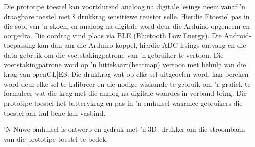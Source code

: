 Die prototipe toestel kan voortdurend analoog na digitale lesings neem vanaf 'n draagbare toestel met 8 drukkrag sensitiewe resistor selle. Hierdie Ftoestel pas in die sool van 'n skoen, en analoog na digitale word deur die Arduino opgeneem en oorgedra. Die oordrag vind plaas via BLE (Bluetooth Low Energy). Die Android-toepassing kan dan aan die Arduino koppel, hierdie ADC-lesings ontvang en die data gebruik om die voetstakingpatrone van 'n gebruiker te vertoon. Die voetstakingpatrone word op 'n hittekaart(heatmap) vertoon met behulp van die krag van openGL|ES. Die drukkrag wat op elke sel uitgeoefen word, kan bereken word deur elke sel te kalibreer en die nodige wiskunde te gebruik om 'n grafiek te formuleer wat die krag met die analog na digitale waardes in verband bring. Die prototipe toestel het batterykrag en pas in 'n omhulsel waarmee gebruikers die toestel aan hul bene kan vasbind.

'N Nuwe omhulsel is ontwerp en gedruk met 'n 3D -drukker om die stroombaan van die prototipe toestel te bedek.

